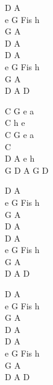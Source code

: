 \begin{chord}
    D A\\
    e G Fis h\\
    G A\\
    D A\\
    D A\\
    e G Fis h\\
    G A\\
    D A D

    C G e a\\
    C h e\\
    C G e a\\
    C\\
    D A e h\\
    G D A G D

    D A\\
    e G Fis h\\
    G A\\
    D A\\
    D A\\
    e G Fis h\\
    G A\\
    D A D

    D A\\
    e G Fis h\\
    G A\\
    D A\\
    D A\\
    e G Fis h\\
    G A\\
    D A D
\end{chord}